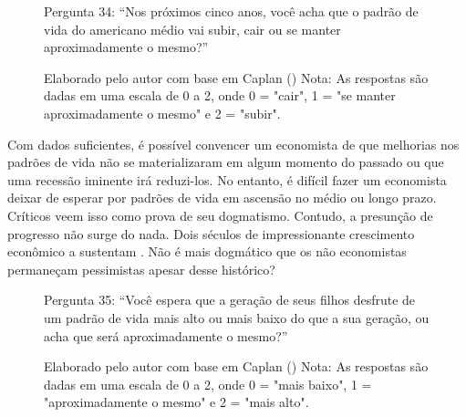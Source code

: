 \begin{figure}[H]
    \centering
    \caption*{Pergunta 34: “Nos próximos cinco anos, você acha que o padrão de vida do americano médio vai subir, cair ou se manter aproximadamente o mesmo?”}
    \caption{Elaborado pelo autor com base em Caplan (\citeyear{The_Myth_of_the_Rational_Voter}) \newline
    Nota: As respostas são dadas em uma escala de 0 a 2, onde 0 = "cair", 1 = "se manter aproximadamente o mesmo" e 2 = "subir".}
    \label{fig:pergunta_34}
\end{figure}

Com dados suficientes, é possível convencer um economista de que melhorias nos padrões de vida não se materializaram em algum momento do passado ou que uma recessão iminente irá reduzi-los. No entanto, é difícil fazer um economista deixar de esperar por padrões de vida em ascensão no médio ou longo prazo. Críticos veem isso como prova de seu dogmatismo. Contudo, a presunção de progresso não surge do nada. Dois séculos de impressionante crescimento econômico a sustentam \cite{catching-up,making-a-miracle,Pursuing-Happiness}. Não é mais dogmático que os não economistas permaneçam pessimistas apesar desse histórico? 


\begin{figure}[H]
    \centering
    \caption*{Pergunta 35: “Você espera que a geração de seus filhos desfrute de um padrão de vida mais alto ou mais baixo do que a sua geração, ou acha que será aproximadamente o mesmo?”}
    \caption{Elaborado pelo autor com base em Caplan (\citeyear{The_Myth_of_the_Rational_Voter}) \newline
    Nota: As respostas são dadas em uma escala de 0 a 2, onde 0 = "mais baixo", 1 = "aproximadamente o mesmo" e 2 = "mais alto".}
    \label{fig:pergunta_35}
\end{figure}

